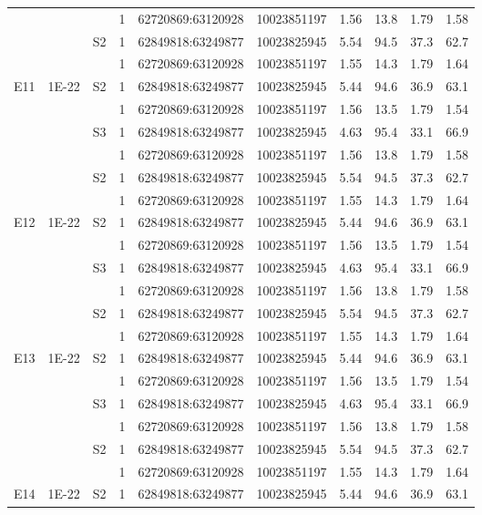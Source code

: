 \documentclass[a4paper,12pt]{article}
\begin{document}
\begin{longtable}{@{\extracolsep{\fill}}llllllllll@{}}
 &  &  & 1 & 62720869:63120928 & 10023851197 & 1.56 & 13.8 & 1.79 & 1.58 \\
 &  & S2 & 1 & 62849818:63249877 & 10023825945 & 5.54 & 94.5 & 37.3 & 62.7 \\
 &  &  & 1 & 62720869:63120928 & 10023851197 & 1.55 & 14.3 & 1.79 & 1.64 \\
E11 & 1E-22 & S2 & 1 & 62849818:63249877 & 10023825945 & 5.44 & 94.6 & 36.9 & 63.1 \\
 &  &  & 1 & 62720869:63120928 & 10023851197 & 1.56 & 13.5 & 1.79 & 1.54 \\
 &  & S3 & 1 & 62849818:63249877 & 10023825945 & 4.63 & 95.4 & 33.1 & 66.9 \\
 &  &  & 1 & 62720869:63120928 & 10023851197 & 1.56 & 13.8 & 1.79 & 1.58 \\
 &  & S2 & 1 & 62849818:63249877 & 10023825945 & 5.54 & 94.5 & 37.3 & 62.7 \\
 &  &  & 1 & 62720869:63120928 & 10023851197 & 1.55 & 14.3 & 1.79 & 1.64 \\
E12 & 1E-22 & S2 & 1 & 62849818:63249877 & 10023825945 & 5.44 & 94.6 & 36.9 & 63.1 \\
 &  &  & 1 & 62720869:63120928 & 10023851197 & 1.56 & 13.5 & 1.79 & 1.54 \\
 &  & S3 & 1 & 62849818:63249877 & 10023825945 & 4.63 & 95.4 & 33.1 & 66.9 \\
 &  &  & 1 & 62720869:63120928 & 10023851197 & 1.56 & 13.8 & 1.79 & 1.58 \\
 &  & S2 & 1 & 62849818:63249877 & 10023825945 & 5.54 & 94.5 & 37.3 & 62.7 \\
 &  &  & 1 & 62720869:63120928 & 10023851197 & 1.55 & 14.3 & 1.79 & 1.64 \\
E13 & 1E-22 & S2 & 1 & 62849818:63249877 & 10023825945 & 5.44 & 94.6 & 36.9 & 63.1 \\
 &  &  & 1 & 62720869:63120928 & 10023851197 & 1.56 & 13.5 & 1.79 & 1.54 \\
 &  & S3 & 1 & 62849818:63249877 & 10023825945 & 4.63 & 95.4 & 33.1 & 66.9 \\
 &  &  & 1 & 62720869:63120928 & 10023851197 & 1.56 & 13.8 & 1.79 & 1.58 \\
 &  & S2 & 1 & 62849818:63249877 & 10023825945 & 5.54 & 94.5 & 37.3 & 62.7 \\
 &  &  & 1 & 62720869:63120928 & 10023851197 & 1.55 & 14.3 & 1.79 & 1.64 \\
E14 & 1E-22 & S2 & 1 & 62849818:63249877 & 10023825945 & 5.44 & 94.6 & 36.9 & 63.1 \\

\end{longtable}
\end{document}
